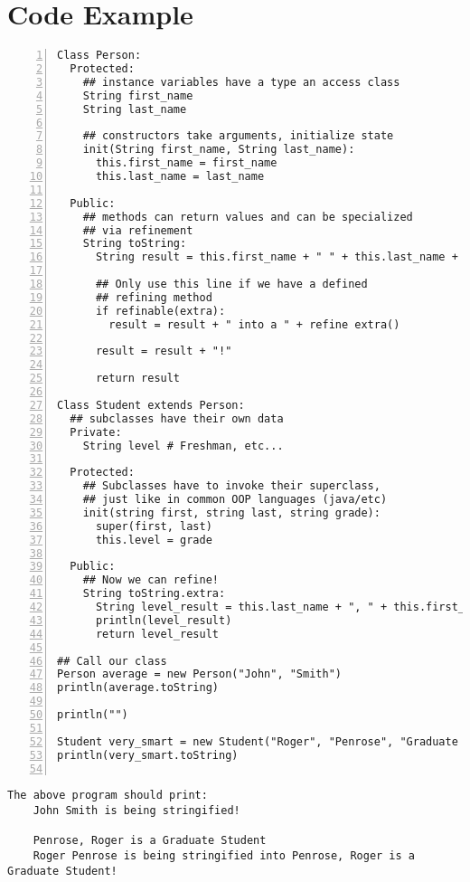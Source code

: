 \documentclass[10pt]{article}
\begin{document}
\section*{Code Example}

\begin{lstlisting}[numbers=left,label=Personhood,caption=Personhood]
Class Person:
  Protected:
    ## instance variables have a type an access class
    String first_name
    String last_name

    ## constructors take arguments, initialize state
    init(String first_name, String last_name):
      this.first_name = first_name
      this.last_name = last_name

  Public:
    ## methods can return values and can be specialized
    ## via refinement
    String toString:
      String result = this.first_name + " " + this.last_name + " is being stringified"
      
      ## Only use this line if we have a defined
      ## refining method
      if refinable(extra):
        result = result + " into a " + refine extra()
      
      result = result + "!"
      
      return result

Class Student extends Person:
  ## subclasses have their own data
  Private:
    String level # Freshman, etc...

  Protected:
    ## Subclasses have to invoke their superclass,
    ## just like in common OOP languages (java/etc)
    init(string first, string last, string grade):
      super(first, last)
      this.level = grade

  Public:
    ## Now we can refine!
    String toString.extra:
      String level_result = this.last_name + ", " + this.first_name + " is a " + this.level
      println(level_result)
      return level_result

## Call our class
Person average = new Person("John", "Smith")
println(average.toString)

println("")

Student very_smart = new Student("Roger", "Penrose", "Graduate Student")
println(very_smart.toString)
  
\end{lstlisting}

\begin{verbatim}
The above program should print:
    John Smith is being stringified!

    Penrose, Roger is a Graduate Student
    Roger Penrose is being stringified into Penrose, Roger is a Graduate Student!
\end{verbatim}
\end{document}
